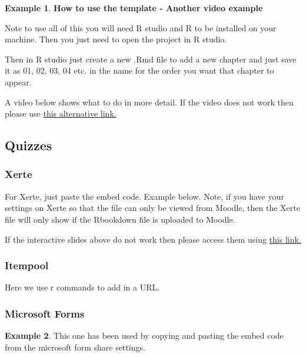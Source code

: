 \documentclass[
]{article}
\numberwithin{equation}{section}
\numberwithin{figure}{section}
\theoremstyle{break}
\theoremstyle{definition}
\theoremstyle{definition}
\newtheorem{example}{Example}[section]
\theoremstyle{definition}
\theoremstyle{definition}
\theoremstyle{remark}
\begin{document}
\begin{example}

\textbf{How to use the template - Another video example}

Note to use all of this you will need R studio and R to be installed on your machine. Then you just need to open the project in R studio.

Then in R studio just create a new .Rmd file to add a new chapter and just save it as 01, 02, 03, 04 etc. in the name for the order you want that chapter to appear.

A video below shows what to do in more detail. If the video does not work then please use \href{https://mediaspace.nottingham.ac.uk/media/How+to+use+the+template/1_brjfqb44}{this alternative link.}

\end{example}

\hypertarget{quizzes}{%
\subsection{Quizzes}\label{quizzes}}

\hypertarget{xerte}{%
\subsubsection{Xerte}\label{xerte}}

For Xerte, just paste the embed code. Example below. Note, if you have your settings on Xerte so that the file can only be viewed from Moodle, then the Xerte file will only show if the Rbookdown file is uploaded to Moodle.

If the interactive slides above do not work then please access them using \href{https://www.nottingham.ac.uk/toolkits/play_25775}{this link.}

\hypertarget{itempool}{%
\subsubsection{Itempool}\label{itempool}}

Here we use r commands to add in a URL.

\hypertarget{microsoft-forms}{%
\subsubsection{Microsoft Forms}\label{microsoft-forms}}

\begin{example}
This one has been used by copying and pasting the embed code from the microsoft form share settings.
\end{example}
\end{document}
